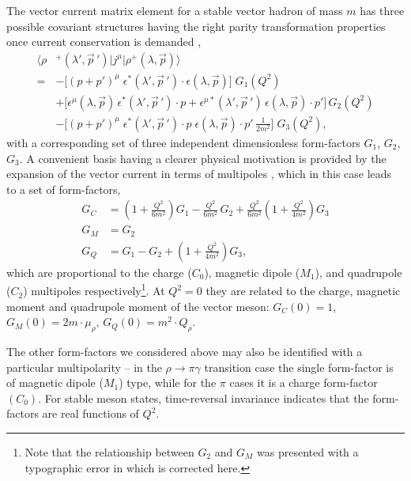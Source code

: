 \documentclass[twocolumn,amsmath,amssymb,prd,10pt,floatfix, 
superscriptaddress,nofootinbib, showpacs, preprintnumbers]{revtex4-1}
\begin{document}
The vector current matrix element for a stable vector hadron of mass $m$ has three possible covariant structures having the right parity transformation properties once current conservation is demanded \cite{Arnold:1979cg}, 
\begin{align}
\big\langle \rho&^+(\lambda',\vec{p}\,') \big| j^\mu \big| \rho^+(\lambda, \vec{p}) \big\rangle \nonumber \\
= 	&- \big[(p+p')^\mu \; \epsilon^*(\lambda',\vec{p}\,') \cdot \epsilon(\lambda,\vec{p}) \big]\; G_1(Q^2) \nonumber \\
	&+ \big[\epsilon^\mu(\lambda,\vec{p}) \, \epsilon^*(\lambda',\vec{p}\,') \!\cdot\! p + \epsilon^{\mu*}(\lambda',\vec{p}\,')\, \epsilon(\lambda,\vec{p})\!\cdot\! p' \big]\, G_2(Q^2) \nonumber \\
	&- \big[(p+p')^\mu \; \epsilon^*(\lambda',\vec{p}\,') \!\cdot\! p \;  \epsilon(\lambda,\vec{p})\!\cdot\! p' \, \tfrac{1}{2m^2} \big]\; G_3(Q^2), \label{eqn::rho_Gi_basis}
\end{align} 
with a corresponding set of three independent dimensionless form-factors $G_1$, $G_2$, $G_3$. A convenient basis having a clearer physical motivation is provided by the expansion of the vector current in terms of multipoles \cite{Durand:1962zza}, which in this case leads to a set of form-factors,
\begin{align}
G_C &= \left(1 + \tfrac{Q^2}{6m^2} \right) G_1 - \tfrac{Q^2}{6m^2} \, G_2 + \tfrac{Q^2}{6m^2} \left(1 + \tfrac{Q^2}{4m^2} \right) G_3 \nonumber \\
G_M &= G_2 \nonumber \\
G_Q &= G_1 - G_2 + \left(1 + \tfrac{Q^2}{4m^2} \right) G_3, \label{eqn::rho_Gmultipole_basis}
\end{align}
which are proportional to the charge ($C_0$), magnetic dipole ($M_1$), and quadrupole ($C_2$) multipoles respectively\footnote{Note that the relationship between $G_2$ and $G_M$ was presented with a typographic error in \cite{Dudek:2006ej} which is corrected here.}. At $Q^2=0$ they are related to the charge, magnetic moment and quadrupole moment of the vector meson: $G_C(0) = 1$, $G_M(0) = 2 m\cdot  \mu_\rho$, $G_Q(0) = m^2 \cdot Q_\rho$.


The other form-factors we considered above may also be identified with a particular multipolarity -- in the ${\rho \to \pi \gamma}$ transition case the single form-factor is of magnetic dipole ($M_1$) type, while for the $\pi$ cases it is a charge form-factor  $(C_0)$. For stable meson states, time-reversal invariance indicates that the form-factors are real functions of $Q^2$.
\end{document}
